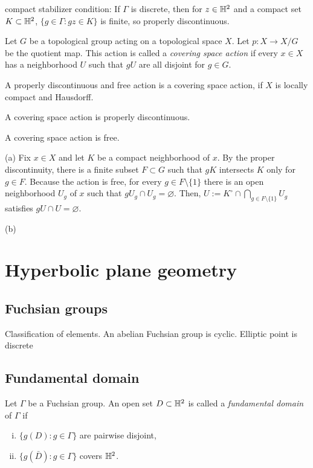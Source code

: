 \documentclass[12pt]{article}
\begin{document}
compact stabilizer condition:
If $\Gamma$ is discrete, then for $z\in\mathbb{H}^2$ and a compact set $K\subset\mathbb{H}^2$, $\{g\in\Gamma:gz\in K\}$ is finite, so properly discontinuous.




\begin{prb}
Let $G$ be a topological group acting on a topological space $X$.
Let $p:X\to X/G$ be the quotient map.
This action is called a \emph{covering space action} if every $x\in X$ has a neighborhood $U$ such that $gU$ are all disjoint for $g\in G$.
\begin{parts}
\item A properly discontinuous and free action is a covering space action, if $X$ is locally compact and Hausdorff.
\item A covering space action is properly discontinuous.
\item A covering space action is free.
\end{parts}
\end{prb}
\begin{pf}
(a)
Fix $x\in X$ and let $K$ be a compact neighborhood of $x$.
By the proper discontinuity, there is a finite subset $F\subset G$ such that $gK$ intersects $K$ only for $g\in F$.
Because the action is free, for every $g\in F\setminus\{1\}$ there is an open neighborhood $U_g$ of $x$ such that $gU_g\cap U_g=\varnothing$.
Then, $U:=K^\circ\cap\bigcap_{g\in F\setminus\{1\}}U_g$ satisfies $gU\cap U=\varnothing$.

(b)

\end{pf}



\section{Hyperbolic plane geometry}
\subsection{Fuchsian groups}
Classification of elements.
An abelian Fuchsian group is cyclic.
Elliptic point is discrete


\subsection{Fundamental domain}

\begin{prb}
Let $\Gamma$ be a Fuchsian group.
An open set $D\subset\mathbb{H}^2$ is called a \emph{fundamental domain} of $\Gamma$ if
\begin{enumerate}[(i)]
\item $\{g(D):g\in\Gamma\}$ are pairwise disjoint,
\item $\{g(\bar D):g\in\Gamma\}$ covers $\mathbb{H}^2$.
\end{enumerate}
\end{prb}
\end{document}
